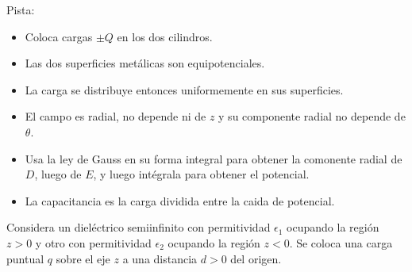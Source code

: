 \documentclass{exam}
\begin{document}
\begin{questions}
  Pista:
  \begin{itemize}
  \item Coloca cargas $\pm Q$ en los dos cilindros.
  \item Las dos superficies metálicas son equipotenciales.
  \item La carga se distribuye entonces uniformemente en sus
    superficies.
  \item El campo es radial, no depende ni de $z$ y su componente
    radial no depende de $\theta$.
  \item Usa la ley de Gauss en su forma integral para obtener la
    comonente radial de $D$, luego de $E$, y luego intégrala para
    obtener el potencial.
  \item La capacitancia es la carga dividida entre la caida de
    potencial.
  \end{itemize}

  \question Considera un dieléctrico semiinfinito con permitividad
  $\epsilon_1$ ocupando la región $z>0$ y otro con permitividad
  $\epsilon_2$ ocupando la región
  $z<0$. Se coloca una carga puntual $q$ sobre el eje $z$ a una
  distancia $d>0$ del origen.
  \begin{parts}

\end{parts}
\end{questions}
\end{document}
